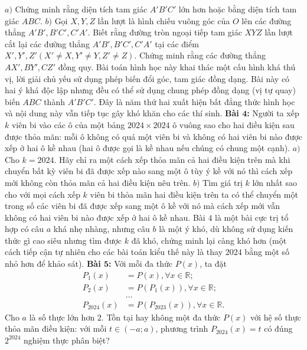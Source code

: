 \begin{multicols}{2}
	\vskip 0.1cm
	$a)$ Chứng minh rằng diện tích tam giác $A'B'C'$ lớn hơn hoặc bằng diện tích tam giác $ABC$.
	\vskip 0.1cm
	$b)$ Gọi $X,Y,Z$ lần lượt là hình chiếu vuông góc của $O$ lên các đường thẳng $A'B',B'C', C'A'$. Biết rằng đường tròn ngoại tiếp tam giác $XYZ$ lần lượt cắt lại các đường thẳng $A'B', B'C', C'A'$ tại các điểm $X',Y',Z' (X' \ne X, Y' \ne Y, Z' \ne Z)$. Chứng minh rằng các đường thẳng $AX', BY', CZ'$ đồng quy.
	\vskip 0.1cm
	Bài toán hình học này khai thác một cấu hình khá thú vị, lời giải chủ yếu sử dụng phép biến đổi góc, tam giác đồng dạng. Bài này có hai ý khá độc lập nhưng đều có thể sử dụng chung phép đồng dạng (vị tự quay) biến $ABC$ thành $A'B'C'$. Đây là năm thứ hai xuất hiện bất đẳng thức hình học và nội dung này vẫn tiếp tục gây khó khăn cho các thí sinh. 
	\vskip 0.1cm
	\textbf{\color{cackithi}Bài $\pmb4$:} Người ta xếp $k$ viên bi vào các ô của một bảng $2024 \times 2024$ ô vuông sao cho hai điều kiện sau được thỏa mãn: mỗi ô không có quá một viên bi và không có hai viên bi nào được xếp ở hai ô kề nhau (hai ô được gọi là kề nhau nếu chúng có chung một cạnh).
	\vskip 0.1cm
	$a)$ Cho $k = 2024$. Hãy chỉ ra một cách xếp thỏa mãn cả hai điều kiện trên mà khi chuyển bất kỳ viên bi đã được xếp nào sang một ô tùy ý kề với nó thì cách xếp mới không còn thỏa mãn cả hai điều kiện nêu trên.
	\vskip 0.1cm
	$b)$ Tìm giá trị $k$ lớn nhất sao cho với mọi cách xếp $k$ viên bi thỏa mãn hai điều kiện trên ta có thể chuyển một trong số các viên bi đã được xếp sang một ô kề với nó mà cách xếp mới vẫn không có hai viên bi nào được xếp ở hai ô kề nhau.
	\vskip 0.1cm
	Bài $4$ là một bài cực trị tổ hợp có câu $a$ khá nhẹ nhàng, nhưng câu $b$ là một ý khó, dù không sử dụng kiến thức gì cao siêu nhưng tìm được $k$ đã khó, chứng minh lại càng khó hơn (một cách tiếp cận tự nhiên cho các bài toán kiểu thế này là thay $2024$ bằng một số nhỏ hơn để khảo sát). 
	\vskip 0.1cm
	\textbf{\color{cackithi}Bài $\pmb5$:} Với mỗi đa thức $P(x)$, ta đặt 
	\begin{align*}
		P_1(x) &= P(x), \forall x\in \mathbb{R};\\
		P_2(x) &= P\left(P_1(x)\right), \forall x\in \mathbb{R};\\
		&\ldots\\
		P_{2024}(x)&= P\left(P_{2023}(x)\right), \forall x \in \mathbb{R}.
	\end{align*}
	Cho $a$ là số thực lớn hơn $2$. Tồn tại hay không một đa thức $P(x)$ với hệ số thực thỏa mãn điều kiện: với mỗi $t\in (-a;a)$, phương trình $P_{2024} (x) = t$ có đúng $2^{2024}$ nghiệm thực phân biệt?
	\vskip 0.1cm

\end{multicols}
